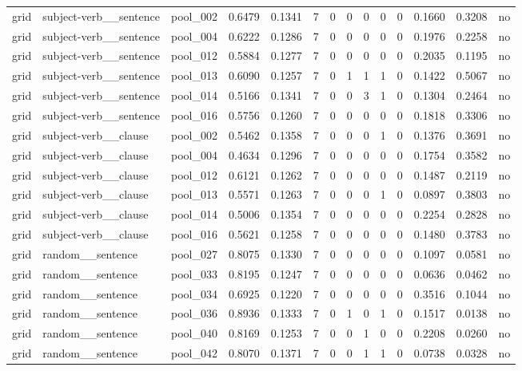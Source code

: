 \begin{table}[t]
{\begin{tabular}{llllllllllllll}
grid & subject-verb\_\_sentence & pool\_002 & 0.6479 & 0.1341 & 7 & 0 & 0 & 0 & 0 & 0 & 0.1660 & 0.3208 & no \\
grid & subject-verb\_\_sentence & pool\_004 & 0.6222 & 0.1286 & 7 & 0 & 0 & 0 & 0 & 0 & 0.1976 & 0.2258 & no \\
grid & subject-verb\_\_sentence & pool\_012 & 0.5884 & 0.1277 & 7 & 0 & 0 & 0 & 0 & 0 & 0.2035 & 0.1195 & no \\
grid & subject-verb\_\_sentence & pool\_013 & 0.6090 & 0.1257 & 7 & 0 & 1 & 1 & 1 & 0 & 0.1422 & 0.5067 & no \\
grid & subject-verb\_\_sentence & pool\_014 & 0.5166 & 0.1341 & 7 & 0 & 0 & 3 & 1 & 0 & 0.1304 & 0.2464 & no \\
grid & subject-verb\_\_sentence & pool\_016 & 0.5756 & 0.1260 & 7 & 0 & 0 & 0 & 0 & 0 & 0.1818 & 0.3306 & no \\
grid & subject-verb\_\_clause & pool\_002 & 0.5462 & 0.1358 & 7 & 0 & 0 & 0 & 1 & 0 & 0.1376 & 0.3691 & no \\
grid & subject-verb\_\_clause & pool\_004 & 0.4634 & 0.1296 & 7 & 0 & 0 & 0 & 0 & 0 & 0.1754 & 0.3582 & no \\
grid & subject-verb\_\_clause & pool\_012 & 0.6121 & 0.1262 & 7 & 0 & 0 & 0 & 0 & 0 & 0.1487 & 0.2119 & no \\
grid & subject-verb\_\_clause & pool\_013 & 0.5571 & 0.1263 & 7 & 0 & 0 & 0 & 1 & 0 & 0.0897 & 0.3803 & no \\
grid & subject-verb\_\_clause & pool\_014 & 0.5006 & 0.1354 & 7 & 0 & 0 & 0 & 0 & 0 & 0.2254 & 0.2828 & no \\
grid & subject-verb\_\_clause & pool\_016 & 0.5621 & 0.1258 & 7 & 0 & 0 & 0 & 0 & 0 & 0.1480 & 0.3783 & no \\
grid & random\_\_sentence & pool\_027 & 0.8075 & 0.1330 & 7 & 0 & 0 & 0 & 0 & 0 & 0.1097 & 0.0581 & no \\
grid & random\_\_sentence & pool\_033 & 0.8195 & 0.1247 & 7 & 0 & 0 & 0 & 0 & 0 & 0.0636 & 0.0462 & no \\
grid & random\_\_sentence & pool\_034 & 0.6925 & 0.1220 & 7 & 0 & 0 & 0 & 0 & 0 & 0.3516 & 0.1044 & no \\
grid & random\_\_sentence & pool\_036 & 0.8936 & 0.1333 & 7 & 0 & 1 & 0 & 1 & 0 & 0.1517 & 0.0138 & no \\
grid & random\_\_sentence & pool\_040 & 0.8169 & 0.1253 & 7 & 0 & 0 & 1 & 0 & 0 & 0.2208 & 0.0260 & no \\
grid & random\_\_sentence & pool\_042 & 0.8070 & 0.1371 & 7 & 0 & 0 & 1 & 1 & 0 & 0.0738 & 0.0328 & no \\

\end{tabular}}
\end{table}
